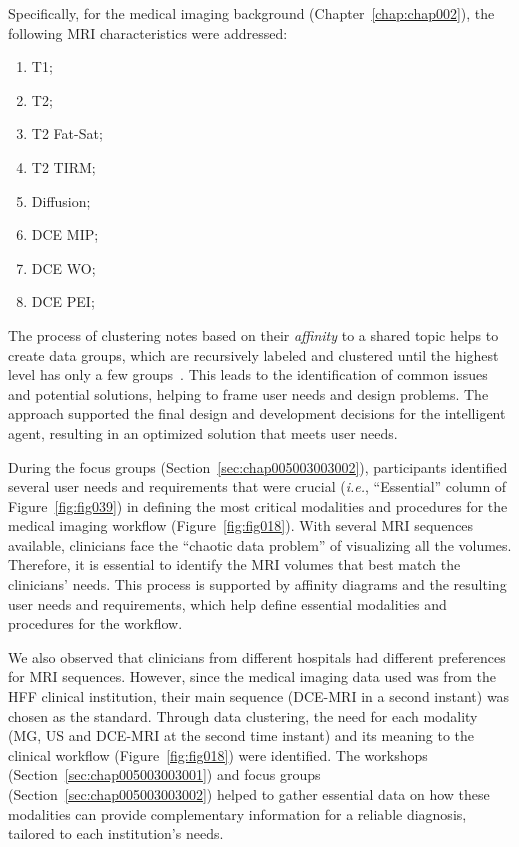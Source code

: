\noindent
Specifically, for the medical imaging background (Chapter~\ref{chap:chap002}), the following \ac{MRI} characteristics were addressed:

\vspace{0.05mm}

\begin{multicols}{4}
\begin{enumerate}
\item T1;
\item T2;
\item T2 Fat-Sat;
\item T2 TIRM;
\item Diffusion;
\item DCE MIP;
\item DCE WO;
\item DCE PEI;
\end{enumerate}
\end{multicols}

\vspace{0.05mm}

The process of clustering notes based on their {\it affinity} to a shared topic helps to create data groups, which are recursively labeled and clustered until the highest level has only a few groups~\cite{harrington2016affinity}.
This leads to the identification of common issues and potential solutions, helping to frame user needs and design problems.
The approach supported the final design and development decisions for the intelligent agent, resulting in an optimized solution that meets user needs.

During the focus groups (Section~\ref{sec:chap005003003002}), participants identified several user needs and requirements that were crucial ({\it i.e.}, ``Essential'' column of Figure~\ref{fig:fig039}) in defining the most critical modalities and procedures for the medical imaging workflow (Figure~\ref{fig:fig018}).
With several \ac{MRI} sequences available, clinicians face the ``chaotic data problem'' of visualizing all the volumes.
Therefore, it is essential to identify the \ac{MRI} volumes that best match the clinicians' needs.
This process is supported by affinity diagrams and the resulting user needs and requirements, which help define essential modalities and procedures for the workflow.

We also observed that clinicians from different hospitals had different preferences for \ac{MRI} sequences.
However, since the medical imaging data used was from the \acs{HFF} clinical institution, their main sequence (\acs{DCE-MRI} in a second instant) was chosen as the standard.
Through data clustering, the need for each modality (\acs{MG}, \acs{US} and \acs{DCE-MRI} at the second time instant) and its meaning to the clinical workflow (Figure~\ref{fig:fig018}) were identified.
The workshops (Section~\ref{sec:chap005003003001}) and focus groups (Section~\ref{sec:chap005003003002}) helped to gather essential data on how these modalities can provide complementary information for a reliable diagnosis, tailored to each institution's needs.

